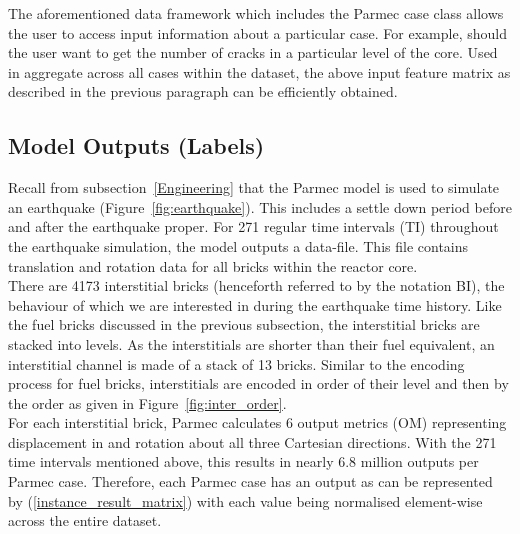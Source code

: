 \noindent
The aforementioned data framework which includes the Parmec case class allows the user to access input information about a particular case.  For example, should the user want to get the number of cracks in a particular level of the core. Used in aggregate across all cases within the dataset, the above input feature matrix as described in the previous paragraph can be efficiently obtained. 
 

\subsection{Model Outputs (Labels)}


Recall from subsection~\ref{Engineering} that the Parmec model is used to simulate an earthquake (Figure~\ref{fig:earthquake}). This includes a settle down period before and after the earthquake proper. For 271 regular time intervals (TI) throughout the earthquake simulation, the model outputs a data-file. This file contains translation and rotation data for all bricks within the reactor core. 
\\

\noindent
There are 4173 interstitial bricks (henceforth referred to by the notation BI), the behaviour of which we are interested in during the earthquake time history. Like the fuel bricks discussed in the previous subsection, the interstitial bricks are stacked into levels. As the interstitials are shorter than their fuel equivalent, an interstitial channel is made of a stack of 13 bricks. Similar to the encoding process for fuel bricks, interstitials are encoded in order of their level and then by the order as given in Figure~\ref{fig:inter_order}.
\\

\noindent
For each interstitial brick, Parmec calculates 6 output metrics (OM) representing displacement in and rotation about all three Cartesian directions. With the 271 time intervals mentioned above, this results in nearly 6.8 million outputs per Parmec case. Therefore, each Parmec case has an output as can be represented by (\ref{instance_result_matrix}) with each value being normalised element-wise across the entire dataset.  
\\


